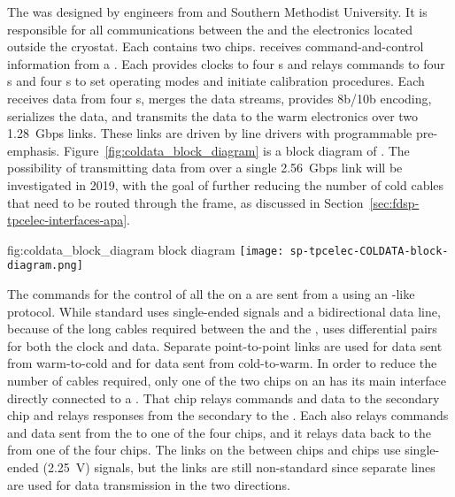 The   was designed by engineers from  
and Southern Methodist University. It is responsible for all communications 
between the  and the electronics located outside the cryostat. 
Each  contains two  chips.  receives 
command-and-control information from a . Each  provides 
clocks to four s and relays commands to four s
and four s to set operating modes and 
initiate calibration procedures.  Each  receives data from four 
s, merges the data streams, provides 8b/10b encoding, serializes 
the data, and transmits the data to the warm electronics over two \SI{1.28}{Gbps} 
links.  These links are driven by line drivers with programmable pre-emphasis. 
Figure~\ref{fig:coldata_block_diagram} is a block diagram of . 
The possibility of transmitting data from  over a single 
\SI{2.56}{Gbps} link will be investigated in 2019, with the goal of further
reducing the number of cold cables that need to be routed through the
 frame, as discussed in Section~\ref{sec:fdsp-tpcelec-interfaces-apa}.

\begin{dunefigure}
{fig:coldata_block_diagram}
{ block diagram}
\texttt{[image: sp-tpcelec-COLDATA-block-diagram.png]}
\end{dunefigure}

The commands for the control of all the  on a  are sent 
from a   
using an -like~\cite{bib:I2C} protocol. While standard 
 uses single-ended  signals and a bidirectional data 
line, because of the long cables required between the  and the 
,  uses  differential pairs for both 
the  clock and data. Separate point-to-point links are used for
data sent from warm-to-cold and for data sent from cold-to-warm.
In order to reduce the number of cables required, only one of the two 
 chips on an  has its main  interface 
directly connected to a . That  chip relays  
commands and data to the secondary  chip and relays  
responses from the secondary  to the . 
Each   also relays  commands and data sent from the 
 to one of the four  chips, and it relays data back to
the  from one of the  four  chips. 
The links on the  between  
chips and  chips use single-ended (\SI{2.25}{V})  
signals, but the  links are still non-standard since separate lines are
used for data transmission in the two directions.

